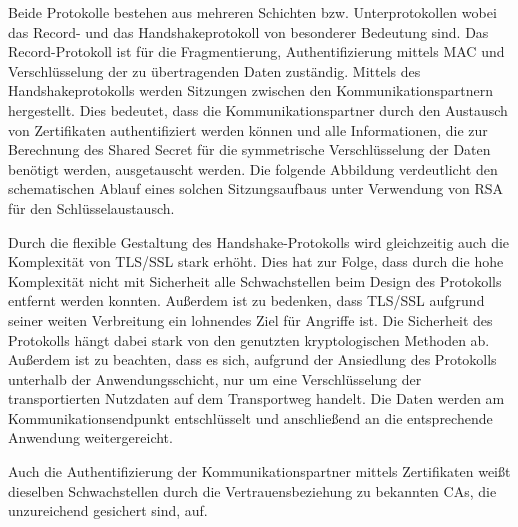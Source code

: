 
Beide Protokolle bestehen aus mehreren Schichten bzw. Unterprotokollen wobei das Record- und das Handshakeprotokoll von besonderer Bedeutung sind. 
Das Record-Protokoll ist für die Fragmentierung, Authentifizierung mittels \ac{MAC} und Verschlüsselung der zu übertragenden Daten zuständig. 
Mittels des Handshakeprotokolls werden Sitzungen zwischen den Kommunikationspartnern hergestellt. 
Dies bedeutet, dass die Kommunikationspartner durch den Austausch von Zertifikaten authentifiziert werden können und alle Informationen, die zur Berechnung des Shared Secret für die symmetrische Verschlüsselung der Daten benötigt werden, ausgetauscht werden. 
Die folgende Abbildung verdeutlicht den schematischen Ablauf eines solchen Sitzungsaufbaus unter Verwendung von \ac{RSA} für den Schlüsselaustausch.

Durch die flexible Gestaltung des Handshake-Protokolls wird gleichzeitig auch die Komplexität von \ac{TLS/SSL} stark erhöht. 
Dies hat zur Folge, dass durch die hohe Komplexität nicht mit Sicherheit alle Schwachstellen beim Design des Protokolls entfernt werden konnten. 
Außerdem ist zu bedenken, dass \ac{TLS/SSL} aufgrund seiner weiten Verbreitung ein lohnendes Ziel für Angriffe ist. Die Sicherheit des Protokolls hängt dabei stark von den genutzten kryptologischen Methoden ab. 
Außerdem ist zu beachten, dass es sich, aufgrund der Ansiedlung des Protokolls unterhalb der Anwendungsschicht, nur um eine Verschlüsselung der transportierten Nutzdaten auf dem Transportweg handelt. 
Die Daten werden am Kommunikationsendpunkt entschlüsselt und anschließend an die entsprechende Anwendung weitergereicht.

Auch die Authentifizierung der Kommunikationspartner mittels Zertifikaten weißt dieselben Schwachstellen durch die Vertrauensbeziehung zu bekannten \acp{CA}, die unzureichend gesichert sind, auf.  